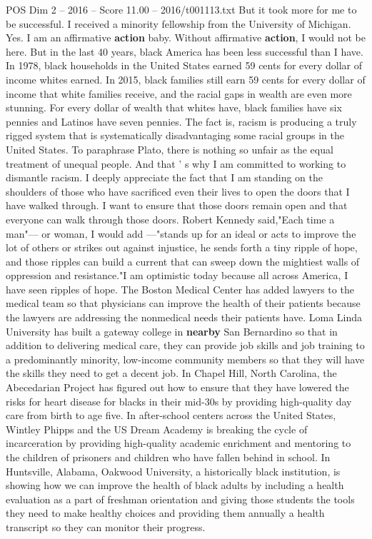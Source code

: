 \begin{textsample}{POS Dim 2 – 2016 – Score 11.00 – 2016/t001113.txt}
But it took more for me to be successful.
I received a minority fellowship from the University of Michigan.
Yes.
I am an affirmative \textbf{action} baby.
Without affirmative \textbf{action}, I would not be here.
But in the last 40 years, black America has been less successful than I have.
In 1978, black households in the United States earned 59 cents for every dollar of income whites earned.
In 2015, black families still earn 59 cents for every dollar of income that white families receive, and the racial gaps in wealth are even more stunning.
For every dollar of wealth that whites have, black families have six pennies and Latinos have seven pennies.
The fact is, racism is producing a truly rigged system that is systematically disadvantaging some racial groups in the United States.
To paraphrase Plato, there is nothing so unfair as the equal treatment of unequal people.
And that ' s why I am committed to working to dismantle racism.
I deeply appreciate the fact that I am standing on the shoulders of those who have sacrificed even their lives to open the doors that I have walked through.
I want to ensure that those doors remain open and that everyone can walk through those doors.
Robert Kennedy said,"Each time a man"— or woman, I would add —"stands up for an ideal or acts to improve the lot of others or strikes out against injustice, he sends forth a tiny ripple of hope, and those ripples can build a current that can sweep down the mightiest walls of oppression and resistance."I am optimistic today because all across America, I have seen ripples of hope.
The Boston Medical Center has added lawyers to the medical team so that physicians can improve the health of their patients because the lawyers are addressing the nonmedical needs their patients have.
Loma Linda University has built a gateway college in \textbf{nearby} San Bernardino so that in addition to delivering medical care, they can provide job skills and job training to a predominantly minority, low-income community members so that they will have the skills they need to get a decent job.
In Chapel Hill, North Carolina, the Abecedarian Project has figured out how to ensure that they have lowered the risks for heart disease for blacks in their mid-30s by providing high-quality day care from birth to age five.
In after-school centers across the United States, Wintley Phipps and the US Dream Academy is breaking the cycle of incarceration by providing high-quality academic enrichment and mentoring to the children of prisoners and children who have fallen behind in school.
In Huntsville, Alabama, Oakwood University, a historically black institution, is showing how we can improve the health of black adults by including a health evaluation as a part of freshman orientation and giving those students the tools they need to make healthy choices and providing them annually a health transcript so they can monitor their progress.

\end{textsample}
